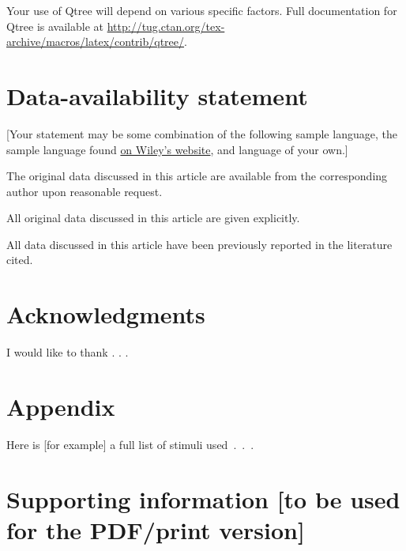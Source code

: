 \documentclass[letterpaper,12pt, twoside]{article}
\begin{document}
Your use of {Qtree} will depend on various specific factors.  Full documentation for  {Qtree} is available at {\href{http://tug.ctan.org/tex-archive/macros/latex/contrib/qtree/}{http://tug.ctan.org/tex-archive/macros/latex/contrib/qtree/}}.








\section*{Data-availability statement}
\label{sec:datastatement}
[Your statement may be some combination of the following sample language, the sample language found \href{https://authorservices.wiley.com/author-resources/Journal-Authors/open-access/data-sharing-citation/data-sharing-policy.html}{on Wiley's website}, and language of your own.] 

The original data discussed in this article are available from the corresponding author upon reasonable request. 

All original data discussed in this article are given explicitly. 

All data discussed in this article have been previously reported in the literature cited.


\section*{Acknowledgments}
\label{sec:ack}
I would like to thank . . .


 

\section*{Appendix}
\label{sec:appx}
Here is [for example] a full list of stimuli used~.~.~.

\section*{Supporting information [to be used for the PDF/print version]}
\label{sec:suppinfo}
\end{document}
